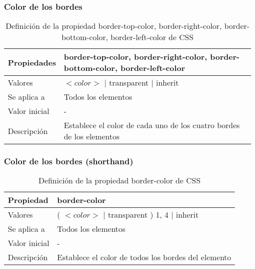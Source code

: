 
\begin{frame}
\frametitle{Color de los bordes}

\begin{center}
  \begin{table}
   \begin{tabular}{p{1.8cm}p{7.8cm}}
Propiedades & \bf{border-top-color}, \bf{border-right-color}, \bf{border-bottom-color}, \bf{border-left-color} \\ \hline
Valores & $<color>$ | transparent | inherit \\ \hline
Se aplica a & Todos los elementos \\ \hline
Valor inicial & - \\ \hline
Descripción & Establece el color de cada uno de los cuatro bordes de los elementos \\ \hline
  \end{tabular}
   \caption{Definición de la propiedad border-top-color, border-right-color, border-bottom-color, border-left-color de CSS}
 \end{table}
\end{center}

\end{frame}


\begin{frame}
\frametitle{Color de los bordes (shorthand)}

\begin{center}
  \begin{table}
   \begin{tabular}{p{1.8cm}p{7.8cm}}
Propiedad &\bf{border-color} \\ \hline
Valores & ( $<color>$ | transparent ) {1, 4} | inherit \\ \hline
Se aplica a & Todos los elementos \\ \hline
Valor inicial & - \\ \hline
Descripción & Establece el color de todos los bordes del elemento \\ \hline
  \end{tabular}
   \caption{Definición de la propiedad border-color de CSS}
 \end{table}
\end{center}

\end{frame}

